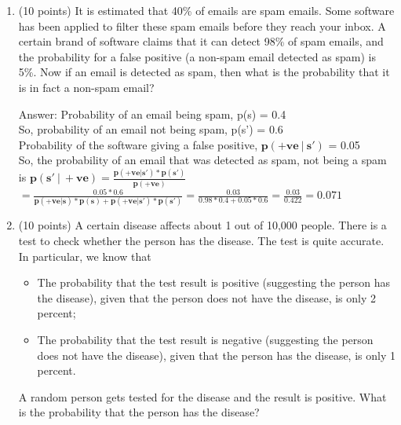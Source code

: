 \documentclass{article}%
\begin{document}
\begin{enumerate}
    \item (10 points) It is estimated that 40\% of emails are spam emails. Some software has been applied to filter these spam emails before they reach your inbox. A certain brand of software claims that it can detect 98\% of spam emails, and the probability for a false positive (a non-spam email detected as spam) is 5\%. Now if an email is detected as spam, then what is the probability that it is in fact a non-spam email?
    
    Answer: Probability of an email being spam, p(s) = 0.4 \\ 
    So, probability of an email not being spam, p(s') = 0.6 \\
    Probability of the software giving a false positive, $\mathbf{ p(+ve \ | \ s') }$ = 0.05 \\
    So, the probability of an email that was detected as spam, not being a spam is $\mathbf{ p(s' \ | \ +ve) = \frac{p(+ve | s') * p(s')}{p(+ve)} }$ \\
    $\mathbf{ = \frac{0.05 * 0.6}{p(+ve|s) * p(s) + p(+ve|s') * p(s')} = \frac{0.03}{0.98 * 0.4 + 0.05 * 0.6} = \frac{0.03}{0.422} = 0.071 }$

    \item (10 points) A  certain  disease  affects  about 1 out  of 10,000  people.  There  is  a  test  to  check whether the person has the disease. The test is quite accurate. In particular, we know that

    \begin{itemize}
        \item The probability that the test result is positive  (suggesting the person has the disease), given that the person does not have the disease, is only 2 percent; 
        \item The probability that the test result is negative (suggesting the person does not have the disease), given that the person has the disease, is only 1 percent. 
    \end{itemize}

    A random person gets tested for the disease and the result is positive. What is the probability that the person has the disease?
\end{enumerate}
\end{document}
